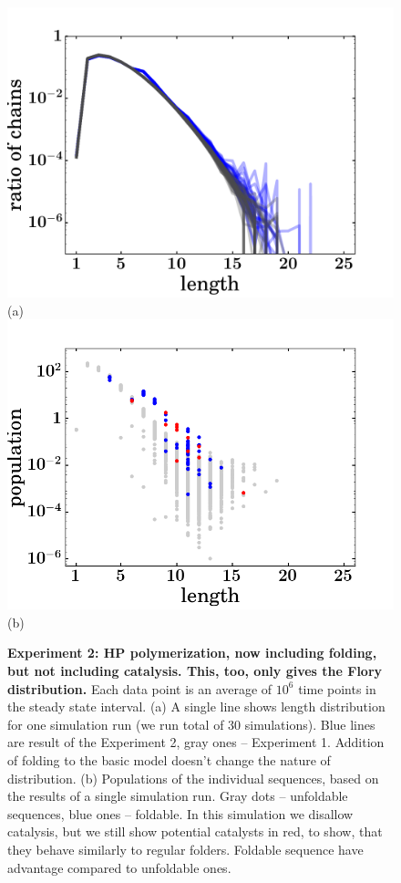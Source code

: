 \documentclass[journal=jacsat,manuscript=article,layout=twocolumn]{achemso}
\begin{document}
\begin{figure}[hbt!]
  \centering
  \includegraphics[width=0.9\columnwidth]{pictures/distr-folded-many.pdf} (a)
   \includegraphics[width=0.9\columnwidth]{pictures/scatter209.png}(b)
  \caption{\footnotesize{\textbf{Experiment 2: HP polymerization, now including folding, but not 
including catalysis.  This, too, only gives the Flory distribution.}  Each data point is an 
average 
of $10^6$ time points in the steady state interval. (a) 
A single line shows length distribution for one simulation run (we run total of 30 simulations). 
Blue lines are result of the Experiment 2, gray ones -- Experiment 1. Addition of folding to the 
basic model doesn't change the nature of distribution. (b) Populations of the individual 
sequences, 
based on the results of a single simulation run. Gray dots -- unfoldable sequences, blue ones -- 
foldable. In this simulation we disallow catalysis, but we still show potential catalysts in red, 
to show, that they behave similarly to regular folders. Foldable sequence have advantage compared 
to unfoldable ones.}}
  \label{fig:sim.flory-fold}
\end{figure}
\end{document}
